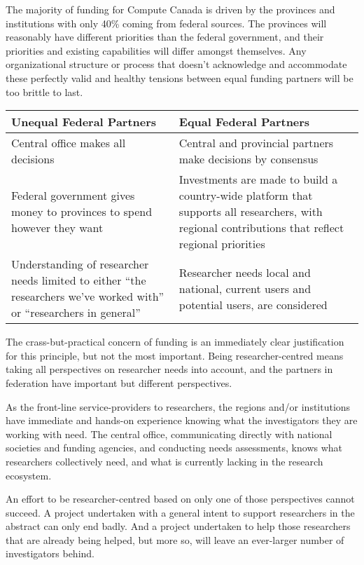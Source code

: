 \documentclass[11pt, letterpaper, twoside]{article}
\begin{document}
The majority of funding for Compute Canada is driven by the provinces
and institutions with only 40\% coming from federal sources.  The
provinces will reasonably have different priorities than the federal
government, and their priorities and existing capabilities will differ
amongst themselves. Any organizational structure or process that doesn't
acknowledge and accommodate these perfectly valid and healthy tensions
between equal funding partners will be too brittle to last.

\begin{table}[ht]
\centering
\small {\sffamily
{}
\begin{tabular}{P{2.5in}|P{2.5in}}
\textcolor{cdaRed}{\textbf{Unequal Federal Partners}} & \textcolor{cdaRed}{\textbf{Equal Federal Partners}} \\
\hline \hline
Central office makes all decisions & Central and provincial partners make decisions by consensus\\
Federal government gives money to provinces to spend however they want & Investments are made to build a country-wide platform that supports all researchers, with regional contributions that reflect regional priorities \\
Understanding of researcher needs limited to either \enquote{the researchers we've worked with} or \enquote{researchers in general} & Researcher needs local and national, current users and potential users, are considered \\
\hline
\end{tabular}
}
\end{table}

The crass-but-practical concern of funding is an immediately clear
justification for this principle, but not the most important. Being
researcher-centred means taking all perspectives on researcher needs
into account, and the partners in federation have important but
different perspectives.

As the front-line service-providers to researchers, the regions and/or
institutions have immediate and hands-on experience knowing what the
investigators they are working with need. The central office,
communicating directly with national societies and funding agencies, and
conducting needs assessments, knows what researchers collectively need,
and what is currently lacking in the research ecosystem.

An effort to be researcher-centred based on only one of those
perspectives cannot succeed. A project undertaken with a general intent
to support researchers in the abstract can only end badly. And a project
undertaken to help those researchers that are already being helped, but
more so, will leave an ever-larger number of investigators behind.
\end{document}
